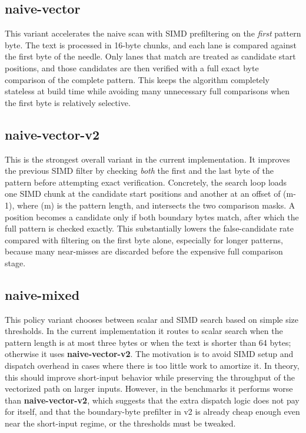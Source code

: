 \documentclass[11pt]{article}
\begin{document}
\subsection{naive-vector}
This variant accelerates the naive scan with SIMD prefiltering on the \emph{first} pattern byte. The text is processed in 16-byte chunks, and each lane is compared against the first byte of the needle. Only lanes that match are treated as candidate start positions, and those candidates are then verified with a full exact byte comparison of the complete pattern. This keeps the algorithm completely stateless at build time while avoiding many unnecessary full comparisons when the first byte is relatively selective.

\subsection{naive-vector-v2}
This is the strongest overall variant in the current implementation. It improves the previous SIMD filter by checking \emph{both} the first and the last byte of the pattern before attempting exact verification. Concretely, the search loop loads one SIMD chunk at the candidate start positions and another at an offset of (m-1), where (m) is the pattern length, and intersects the two comparison masks. A position becomes a candidate only if both boundary bytes match, after which the full pattern is checked exactly. This substantially lowers the false-candidate rate compared with filtering on the first byte alone, especially for longer patterns, because many near-misses are discarded before the expensive full comparison stage. 

\subsection{naive-mixed}
This policy variant chooses between scalar and SIMD search based on simple size thresholds. In the current implementation it routes to scalar search when the pattern length is at most three bytes or when the text is shorter than 64 bytes; otherwise it uses \textbf{naive-vector-v2}. The motivation is to avoid SIMD setup and dispatch overhead in cases where there is too little work to amortize it. In theory, this should improve short-input behavior while preserving the throughput of the vectorized path on larger inputs. However, in the benchmarks it performs worse than \textbf{naive-vector-v2}, which suggests that the extra dispatch logic does not pay for itself, and that the boundary-byte prefilter in v2 is already cheap enough even near the short-input regime, or the thresholds must be tweaked. 
\end{document}
